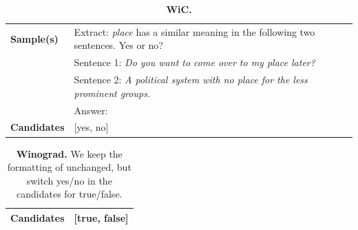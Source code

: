 \documentclass{article}
\begin{document}
\begin{table}[h]
\caption{\textbf{WiC.}}
\begin{tabular}{lp{11.5cm}}
\toprule
\textbf{Sample(s)} & Extract: \emph{place} has a similar meaning in the following two sentences. Yes or no? \\
& Sentence 1: \emph{Do you want to come over to my place later?} \\
& Sentence 2: \emph{A political system with no place for the less prominent groups.} \\
& Answer:\\
\textbf{Candidates}   & {[}yes, no{]}         \\ \bottomrule                                                    
\end{tabular}
\end{table}

\begin{table}[h]
\caption{\textbf{Winograd.} We keep the formatting of \citet{eval-harness} unchanged, but switch yes/no in the candidates for true/false.}
\begin{tabular}{lp{11.5cm}}
\toprule
\textbf{Candidates}   & {[}true, false{]}         \\ \bottomrule                                                    
\end{tabular}
\end{table}
\end{document}
